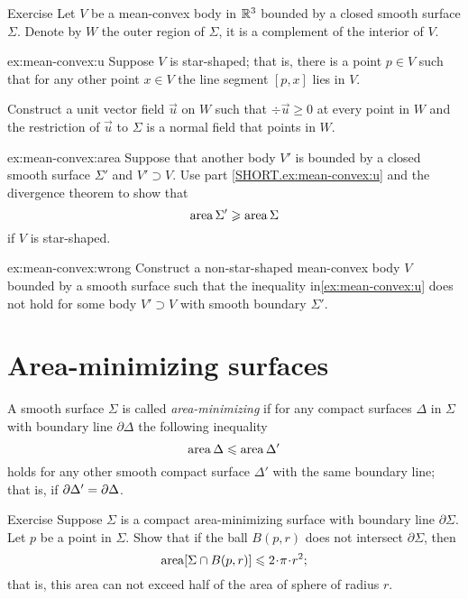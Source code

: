 \begin{thm}{Exercise}\label{ex:mean-convex}
Let $V$ be a mean-convex body in $\mathbb{R}^3$ bounded by a closed smooth surface $\Sigma$.
Denote by $W$ the outer region of $\Sigma$, it is a complement of the interior of $V$.

\begin{subthm}{ex:mean-convex:u}
Suppose $V$ is star-shaped; that is, there is a point $p\in V$ such that for any other point $x\in V$ the line segment $[p,x]$ lies in $V$.

Construct a unit vector field $\vec u$ on $W$ such that $\div  \vec u\ge 0$ at every point in $W$ and the restriction of $\vec u$ to $\Sigma$ is a normal field that points in $W$.
\end{subthm}
 
\begin{subthm}{ex:mean-convex:area} Suppose that another body $V'$ is bounded by a closed smooth surface $\Sigma'$ and $V'\supset V$.
Use part \ref{SHORT.ex:mean-convex:u} and the divergence theorem to show that 
\[\mathop{\rm area}\nolimits\Sigma'\geqslant \mathop{\rm area}\nolimits\Sigma\]
if $V$ is star-shaped.
\end{subthm}

\begin{subthm}{ex:mean-convex:wrong} Construct a non-star-shaped mean-convex body $V$ bounded by a smooth surface such that the inequality in\ref{ex:mean-convex:u} does not hold for some body $V'\supset V$ with smooth boundary $\Sigma'$.
\end{subthm}
\end{thm}

\section{Area-minimizing surfaces}

A smooth surface $\Sigma$ is called \emph{area-minimizing} if for any compact surfaces $\Delta$ in $\Sigma$ with boundary line $\partial \Delta$ 
the following inequality 
\[\mathop{\rm area}\nolimits \Delta\leqslant \mathop{\rm area}\nolimits \Delta'\]
holds for any other smooth compact surface $\Delta'$ with the same boundary line; that is, if $\partial\Delta'\z=\partial\Delta$.

\begin{thm}{Exercise}\label{ex:area-ball-intersection}
Suppose $\Sigma$ is a compact area-minimizing surface with boundary line $\partial \Sigma$.
Let $p$ be a point in $\Sigma$.
Show that if the ball $B(p,r)$ does not intersect $\partial \Sigma$, then 
\[\area [\Sigma\cap B(p,r)]\le 2\cdot \pi\cdot r^2;\]
that is, this area can not exceed half of the area of sphere of radius $r$.
\end{thm}



